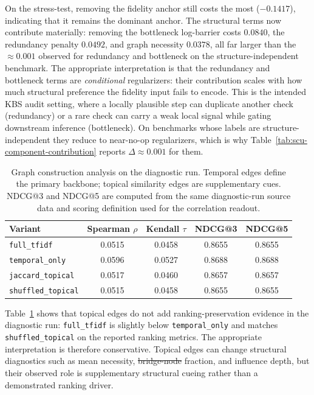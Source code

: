 \documentclass[a4paper,fleqn]{cas-sc}
\makeatletter
\newcommand{\bridgeNode}{\mbox{bridge node}} %
\providecommand{\DIFaddtex}[1]{{\protect\color{blue}\uwave{#1}}} %
\providecommand{\DIFdeltex}[1]{{\protect\color{red}\sout{#1}}} %
\providecommand{\DIFaddbegin}{} %
\providecommand{\DIFaddend}{} %
\providecommand{\DIFdelbegin}{} %
\providecommand{\DIFdelend}{} %
\providecommand{\DIFadd}[1]{\texorpdfstring{\DIFaddtex{#1}}{#1}} %
\providecommand{\DIFdel}[1]{\texorpdfstring{\DIFdeltex{#1}}{}} %
\providecommand{\DIFscaledelfig}{0.5}
\newlength{\DIFdelgraphicswidth} %
\newlength{\DIFdelgraphicsheight} %
\providecommand{\DIFaddincludegraphics}[2][]{{\color{blue}\fbox{\DIFOincludegraphics[#1]{#2}}}} %
\providecommand{\DIFdelincludegraphics}[2][]{%
\sbox{\DIFdelgraphicsbox}{\DIFOincludegraphics[#1]{#2}}%
\settoboxwidth{\DIFdelgraphicswidth}{\DIFdelgraphicsbox} %
\settoboxtotalheight{\DIFdelgraphicsheight}{\DIFdelgraphicsbox} %
\scalebox{\DIFscaledelfig}{%
\parbox[b]{\DIFdelgraphicswidth}{\usebox{\DIFdelgraphicsbox}\\[-\baselineskip] \rule{\DIFdelgraphicswidth}{0em}}\llap{\resizebox{\DIFdelgraphicswidth}{\DIFdelgraphicsheight}{%
\setlength{\unitlength}{\DIFdelgraphicswidth}%
\begin{picture}(1,1)%
\thicklines\linethickness{2pt} %
{\color[rgb]{1,0,0}\put(0,0){\framebox(1,1){}}}%
{\color[rgb]{1,0,0}\put(0,0){\line( 1,1){1}}}%
{\color[rgb]{1,0,0}\put(0,1){\line(1,-1){1}}}%
\end{picture}%
}\hspace*{3pt}}} %
} %
\DeclareRobustCommand{\DIFaddbegin}{\DIFOaddbegin \let\includegraphics\DIFaddincludegraphics} %
\DeclareRobustCommand{\DIFaddend}{\DIFOaddend \let\includegraphics\DIFOincludegraphics} %
\DeclareRobustCommand{\DIFdelbegin}{\DIFOdelbegin \let\includegraphics\DIFdelincludegraphics} %
\DeclareRobustCommand{\DIFdelend}{\DIFOaddend \let\includegraphics\DIFOincludegraphics} %
\let\sout@orig\sout %
\renewcommand{\sout}[1]{\ifmmode\text{\sout@orig{\ensuremath{#1}}}\else\sout@orig{#1}\fi} %
\makeatother
\begin{document}
On the stress-test, removing the fidelity anchor still costs the most ($-0.1417$), indicating that it remains the dominant anchor. The structural terms now contribute materially: removing the bottleneck log-barrier costs $0.0840$, the redundancy penalty $0.0492$, and graph necessity $0.0378$, all far larger than the $\approx 0.001$ observed for redundancy and bottleneck on the structure-independent benchmark. The appropriate interpretation is that the redundancy and bottleneck terms are \emph{conditional} regularizers: their contribution scales with how much structural preference the fidelity input fails to encode. This is the intended KBS audit setting, where a locally plausible step can duplicate another check (redundancy) or a rare check can carry a weak local signal while gating downstream inference (bottleneck). On benchmarks whose labels are structure-independent they reduce to near-no-op regularizers, which is why Table~\ref{tab:scu-component-contribution} reports $\Delta\approx 0.001$ for them.

\begin{table}[ht]
\caption{Graph construction analysis on the diagnostic run. Temporal edges define the primary backbone; topical similarity edges are supplementary cues. NDCG@3 and NDCG@5 are computed from the same diagnostic-run source data and scoring definition used for the correlation readout.}
\label{tab:graph-construction-analysis}
\centering
\small
\renewcommand{\arraystretch}{1.08}
\begin{tabular}{lcccc}
\toprule
\textbf{Variant} & \textbf{Spearman $\rho$} & \textbf{Kendall $\tau$} & \textbf{NDCG@3} & \textbf{NDCG@5} \\
\midrule
\texttt{full\_tfidf} & 0.0515 & 0.0458 & 0.8655 & 0.8655 \\
\texttt{temporal\_only} & 0.0596 & 0.0527 & 0.8688 & 0.8688 \\
\texttt{jaccard\_topical} & 0.0517 & 0.0460 & 0.8657 & 0.8657 \\
\texttt{shuffled\_topical} & 0.0515 & 0.0458 & 0.8655 & 0.8655 \\
\bottomrule
\end{tabular}
\end{table}

Table~\ref{tab:graph-construction-analysis} shows that topical edges do not add ranking-preservation evidence in the diagnostic run: \texttt{full\_tfidf} is slightly below \texttt{temporal\_only} and matches \texttt{shuffled\_topical} on the reported ranking metrics. The appropriate interpretation is therefore conservative. Topical edges can change structural diagnostics such as mean necessity, \DIFdelbegin \DIFdel{bridge-node }\DIFdelend \DIFaddbegin \DIFadd{\bridgeNode{} }\DIFaddend fraction, and influence depth, but their observed role is supplementary structural cueing rather than a demonstrated ranking driver.
\end{document}
